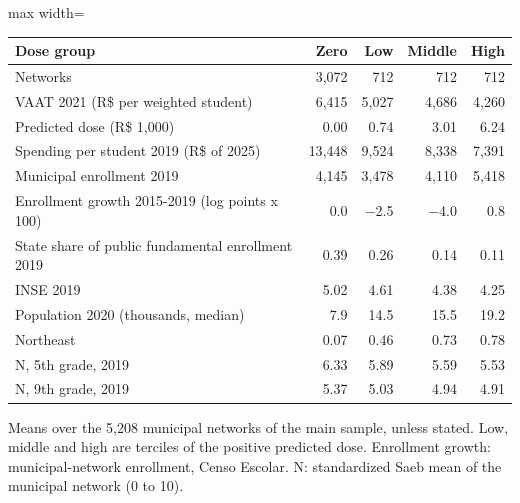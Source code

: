 \begin{adjustbox}{max width=\linewidth}
\begin{tabular}{lrrrr}
\toprule
Dose group & Zero & Low & Middle & High \\
\midrule
Networks & 3{,}072 & 712 & 712 & 712 \\
VAAT 2021 (R\$ per weighted student) & 6{,}415 & 5{,}027 & 4{,}686 & 4{,}260 \\
Predicted dose (R\$ 1,000) & 0.00 & 0.74 & 3.01 & 6.24 \\
Spending per student 2019 (R\$ of 2025) & 13{,}448 & 9{,}524 & 8{,}338 & 7{,}391 \\
Municipal enrollment 2019 & 4{,}145 & 3{,}478 & 4{,}110 & 5{,}418 \\
Enrollment growth 2015-2019 (log points x 100) & 0.0 & $-$2.5 & $-$4.0 & 0.8 \\
State share of public fundamental enrollment 2019 & 0.39 & 0.26 & 0.14 & 0.11 \\
INSE 2019 & 5.02 & 4.61 & 4.38 & 4.25 \\
Population 2020 (thousands, median) & 7.9 & 14.5 & 15.5 & 19.2 \\
Northeast & 0.07 & 0.46 & 0.73 & 0.78 \\
N, 5th grade, 2019 & 6.33 & 5.89 & 5.59 & 5.53 \\
N, 9th grade, 2019 & 5.37 & 5.03 & 4.94 & 4.91 \\
\bottomrule
\end{tabular}
\end{adjustbox}
\par\smallskip\begin{minipage}{0.95\linewidth}\footnotesize Means over the 5,208 municipal networks of the main sample, unless stated. Low, middle and high are terciles of the positive predicted dose. Enrollment growth: municipal-network enrollment, Censo Escolar. N: standardized Saeb mean of the municipal network (0 to 10).\end{minipage}
